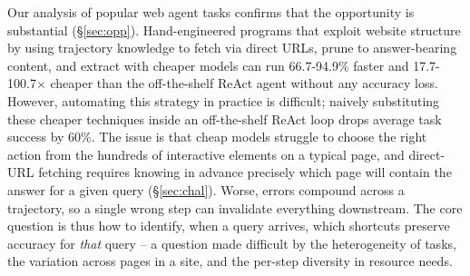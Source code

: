 Our analysis of popular web agent tasks confirms that the opportunity is substantial (\S\ref{sec:opp}). Hand-engineered programs that exploit website structure by using trajectory knowledge to fetch via direct URLs, prune to answer-bearing content, and extract with cheaper models can run 66.7-94.9\% faster and 17.7-100.7$\times$ cheaper than the off-the-shelf ReAct agent without any accuracy loss. However, automating this strategy in practice is difficult; naively substituting these cheaper techniques inside an off-the-shelf ReAct loop drops average task success by 60\%. The issue is that cheap models struggle to choose the right action from the hundreds of interactive elements on a typical page, and direct-URL fetching requires knowing in advance precisely which page will contain the answer for a given query (\S\ref{sec:chal}). Worse, errors compound across a trajectory, so a single wrong step can invalidate everything downstream. The core question is thus how to identify, when a query arrives, which shortcuts preserve accuracy for \emph{that} query -- a question made difficult by the heterogeneity of tasks, the variation across pages in a site, and the per-step diversity in resource needs.


